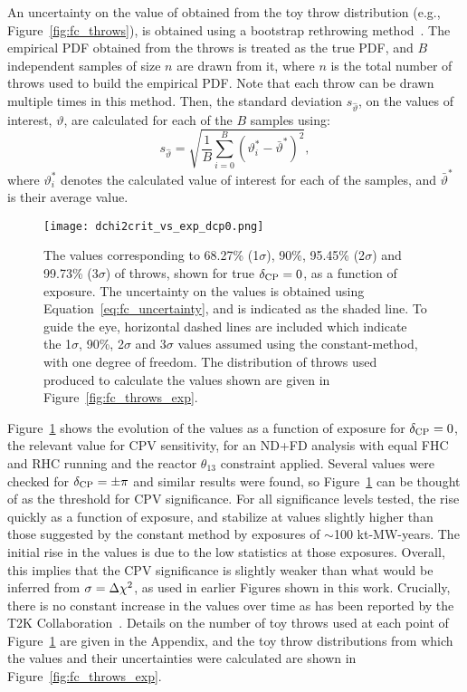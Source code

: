 An uncertainty on the value of \dchisqcrit obtained from the toy throw distribution (e.g., Figure~\ref{fig:fc_throws}), is obtained using a bootstrap rethrowing method~\cite{rice2006mathematical}. The empirical PDF obtained from the throws is treated as the true PDF, and $B$ independent samples of size $n$ are drawn from it, where $n$ is the total number of throws used to build the empirical PDF. Note that each throw can be drawn multiple times in this method. Then, the standard deviation $s_{\hat{\vartheta}}$, on the \dchisqcrit values of interest, $\vartheta$, are calculated for each of the $B$ samples using:
\begin{equation}
  s_{\hat{\vartheta}} = \sqrt{\frac{1}{B} \sum^{B}_{i=0} (\vartheta_{i}^{*} - \bar{\vartheta}^{*})^{2}},
  \label{eq:fc_uncertainty}
\end{equation}
where $\vartheta_{i}^{*}$ denotes the calculated \dchisqcrit value of interest for each of the samples, and $\bar{\vartheta}^{*}$ is their average value.

\begin{figure}[htbp]
  \centering
  \texttt{[image: dchi2crit\_vs\_exp\_dcp0.png]}
  \caption{The \dchisqcrit values corresponding to 68.27\% (1$\sigma$), 90\%, 95.45\% (2$\sigma$) and 99.73\% (3$\sigma$) of throws, shown for true $\delta_{\rm CP} = 0$, as a function of exposure. The uncertainty on the \dchisqcrit values is obtained using Equation~\ref{eq:fc_uncertainty}, and is indicated as the shaded line. To guide the eye, horizontal dashed lines are included which indicate the 1$\sigma$, 90\%, 2$\sigma$ and 3$\sigma$ \dchisq values assumed using the constant-\dchisq method, with one degree of freedom. The distribution of throws used produced to calculate the \dchisqcrit values shown are given in Figure~\ref{fig:fc_throws_exp}.}
  \label{fig:fc_vs_exp}
\end{figure}
Figure~\ref{fig:fc_vs_exp} shows the evolution of the \dchisqcrit values as a function of exposure for $\delta_{\rm CP} = 0$, the relevant value for CPV sensitivity, for an ND+FD analysis with equal FHC and RHC running and the reactor $\theta_{13}$ constraint applied. Several values were checked for $\delta_{\rm CP} = \pm\pi$ and similar results were found, so Figure~\ref{fig:fc_vs_exp} can be thought of as the threshold for CPV significance. For all significance levels tested, the \dchisqcrit rise quickly as a function of exposure, and stabilize at values slightly higher than those suggested by the constant \dchisq method by exposures of $\sim$100 kt-MW-years. The initial rise in the \dchisqcrit values is due to the low statistics at those exposures. Overall, this implies that the CPV significance is slightly weaker than what would be inferred from $\sigma = \Delta\chi^{2}$, as used in earlier Figures shown in this work. Crucially, there is no constant increase in the \dchisqcrit values over time as has been reported by the T2K Collaboration~\cite{Abe:2021gky}. Details on the number of toy throws used at each point of Figure~\ref{fig:fc_vs_exp} are given in the Appendix, and the toy throw distributions from which the \dchisqcrit values and their uncertainties were calculated are shown in Figure~\ref{fig:fc_throws_exp}.

